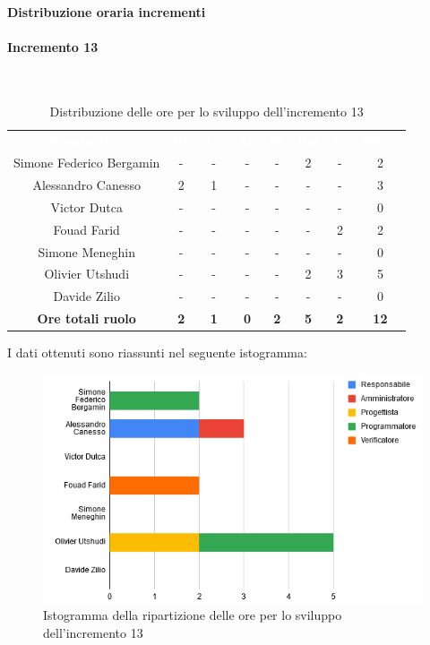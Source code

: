\paragraph{Distribuzione oraria incrementi}
\paragraph*{Incremento 13} \mbox{} \\
\begin{table}[H]
\centering\renewcommand{\arraystretch}{1.5}
\caption{Distribuzione delle ore per lo sviluppo dell'incremento 13}
\vspace{0.2cm}
\begin{tabular}{ c c c c c c c c }
\rowcolor{redafk}
\textcolor{white}{\textbf{Nominativo}} & \textcolor{white}{\textbf{Re}} &
\textcolor{white}{\textbf{Am}} & \textcolor{white}{\textbf{An}} &
\textcolor{white}{\textbf{Pt}} & \textcolor{white}{\textbf{Pm}} &
\textcolor{white}{\textbf{Ve}} & \textcolor{white}{\textbf{Totale}} \\
Simone Federico Bergamin & - & - & - & - & 2 & - & 2 \\
Alessandro Canesso & 2 & 1 & - & - & - & - & 3\\
Victor Dutca & - & - & - & - & - & - & 0 \\
Fouad Farid & - & - & - & - & - & 2 & 2 \\
Simone Meneghin & - & - & - & - & - & - & 0 \\
Olivier Utshudi & - & - & - & - & 2 & 3 & 5 \\
Davide Zilio & - & - & - & - & - & - & 0 \\
\rowcolor{lastrowcolor}
\textbf{Ore totali ruolo} & \textbf{2} & \textbf{1} & \textbf{0} & \textbf{2} & \textbf{5} & \textbf{2} & \textbf{12} \\
\end{tabular}
\end{table}

I dati ottenuti sono riassunti nel seguente istogramma:
\begin{figure}[H]
\centering
\includegraphics[scale=0.60]{img/grafici/tabella_inc13.png}
\caption{Istogramma della ripartizione delle ore per lo sviluppo dell'incremento 13}
\end{figure}

